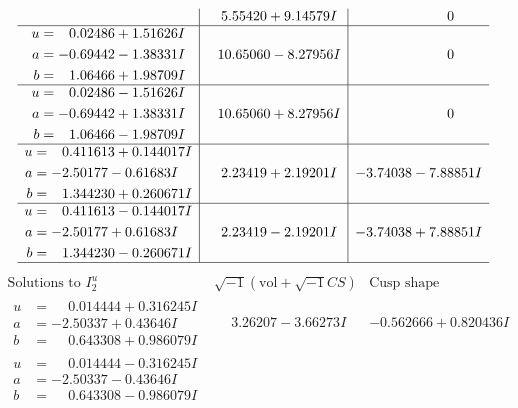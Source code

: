 \documentclass[1p]{elsarticle_modified}
\theoremstyle{definition}
\newcommand{\I}{\sqrt{-1}}
\begin{document}
$$\begin{array}{c|c|c}
 & \phantom{-}5.55420 + 9.14579 I & \phantom{-0.000000 } 0 \\ \hline\begin{aligned}
u &= \phantom{-}0.02486 + 1.51626 I \\
a &= -0.69442 - 1.38331 I \\
b &= \phantom{-}1.06466 + 1.98709 I\end{aligned}
 & \phantom{-}10.65060 - 8.27956 I & \phantom{-0.000000 } 0 \\ \hline\begin{aligned}
u &= \phantom{-}0.02486 - 1.51626 I \\
a &= -0.69442 + 1.38331 I \\
b &= \phantom{-}1.06466 - 1.98709 I\end{aligned}
 & \phantom{-}10.65060 + 8.27956 I & \phantom{-0.000000 } 0 \\ \hline\begin{aligned}
u &= \phantom{-}0.411613 + 0.144017 I \\
a &= -2.50177 - 0.61683 I \\
b &= \phantom{-}1.344230 + 0.260671 I\end{aligned}
 & \phantom{-}2.23419 + 2.19201 I & -3.74038 - 7.88851 I \\ \hline\begin{aligned}
u &= \phantom{-}0.411613 - 0.144017 I \\
a &= -2.50177 + 0.61683 I \\
b &= \phantom{-}1.344230 - 0.260671 I\end{aligned}
 & \phantom{-}2.23419 - 2.19201 I & -3.74038 + 7.88851 I\\
 \hline 
 \end{array}$$\newpage$$\begin{array}{c|c|c}  
\text{Solutions to }I^u_{2}& \I (\text{vol} + \sqrt{-1}CS) & \text{Cusp shape}\\
 \hline 
\begin{aligned}
u &= \phantom{-}0.014444 + 0.316245 I \\
a &= -2.50337 + 0.43646 I \\
b &= \phantom{-}0.643308 + 0.986079 I\end{aligned}
 & \phantom{-}3.26207 - 3.66273 I & -0.562666 + 0.820436 I \\ \hline\begin{aligned}
u &= \phantom{-}0.014444 - 0.316245 I \\
a &= -2.50337 - 0.43646 I \\
b &= \phantom{-}0.643308 - 0.986079 I\end{aligned}

\end{array}$$
\end{document}

